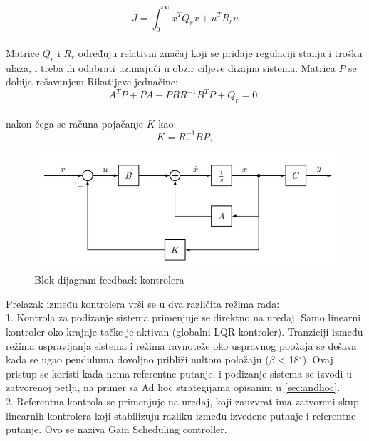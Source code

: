 \documentclass[a4paper,11pt]{article}
\theoremstyle{definition} \newtheorem{deff}{Definicija}[section]
\theoremstyle{definition} \newtheorem{prim}[deff]{Primer}
\theoremstyle{plain} \newtheorem{teor}[deff]{Teorema}
\begin{document}
	\begin{equation}
		J = \int_{0}^{\infty}  x^T Q_r x  + u^T R_r u
	\end{equation} \\
	
	Matrice $Q_r$ i $R_r$ određuju relativni značaj koji se pridaje regulaciji stanja i trošku ulaza, i treba ih odabrati uzimajući u obzir ciljeve dizajna sistema. Matrica $P$ se dobija rešavanjem Rikatijeve jednačine: \\
	\begin{equation}
		A^T P + P A - P B R^{-1} B^T P + Q_r = 0, 
	\end{equation} \\
	
	nakon čega se računa pojačanje $K$ kao:
	\begin{equation}
		K = R_r^{-1}BP, 
	\end{equation}
	
	\begin{figure}[!h]
		\centering
		\includegraphics[width=0.8\linewidth]{slike/lqr.jpg}
		\caption{Blok dijagram feedback kontrolera \cite{inicijalna}}
		\label{fig:lqr}
	\end{figure}
	
	
	
	Prelazak između kontrolera vrši se u dva različita režima rada: \\
	
	1. Kontrola za podizanje sistema primenjuje se direktno na uređaj. Samo linearni kontroler oko krajnje tačke je aktivan (globalni LQR kontroler). Tranziciji između režima uspravljanja sistema i režima ravnoteže oko uspravnog poožaja se dešava kada se ugao penduluma dovoljno približi nultom položaju ($\beta$ < 18$^\circ$). Ovaj pristup se koristi kada nema referentne putanje, i podizanje sistema se izvodi u zatvorenoj petlji, na primer sa Ad hoc strategijama opisanim u \ref{sec:andhoc}. \\
	
	2. Referentna kontrola se primenjuje na uređaj, koji zauzvrat ima zatvoreni skup linearnih kontrolera koji stabilizuju razliku između izvedene putanje i referentne putanje. Ovo se naziva Gain Scheduling controller.\\
	
\end{document}
